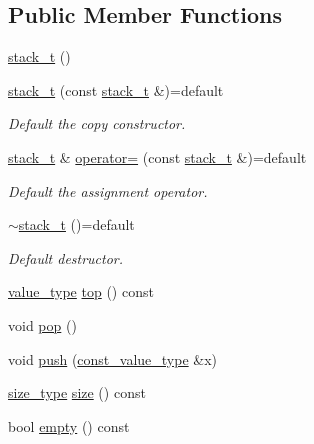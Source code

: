 \subsection*{Public Member Functions}
\begin{DoxyCompactItemize}
\item 
\hyperlink{classstk_1_1stack__t_ab7605ffb3efbfdaf23c1411dba8076d7}{stack\+\_\+t} ()
\item 
\mbox{\label{classstk_1_1stack__t_a27abcc49011f8cd22cd92395655f8ca4}} 
\hyperlink{classstk_1_1stack__t_a27abcc49011f8cd22cd92395655f8ca4}{stack\+\_\+t} (const \hyperlink{classstk_1_1stack__t}{stack\+\_\+t} \&)=default
\begin{DoxyCompactList}\small\item\em Default the copy constructor. \end{DoxyCompactList}\item 
\mbox{\label{classstk_1_1stack__t_a680884feaecd4cb19ea890893c583fdb}} 
\hyperlink{classstk_1_1stack__t}{stack\+\_\+t} \& \hyperlink{classstk_1_1stack__t_a680884feaecd4cb19ea890893c583fdb}{operator=} (const \hyperlink{classstk_1_1stack__t}{stack\+\_\+t} \&)=default
\begin{DoxyCompactList}\small\item\em Default the assignment operator. \end{DoxyCompactList}\item 
\mbox{\label{classstk_1_1stack__t_acd6dfd6efc2edad5c9bd8f126c415a69}} 
\hyperlink{classstk_1_1stack__t_acd6dfd6efc2edad5c9bd8f126c415a69}{$\sim$stack\+\_\+t} ()=default
\begin{DoxyCompactList}\small\item\em Default destructor. \end{DoxyCompactList}\item 
\hyperlink{classstk_1_1stack__t_a05d1586fa8257268f0c1ade7ffc4588e}{value\+\_\+type} \hyperlink{classstk_1_1stack__t_a4c8dca98c8f18b9d60398ac75aba5af7}{top} () const
\item 
void \hyperlink{classstk_1_1stack__t_a5be99b150a46b8456643cbc40bcefca8}{pop} ()
\item 
void \hyperlink{classstk_1_1stack__t_aad7638faa441f17e91ba9a8f5663be4c}{push} (\hyperlink{classstk_1_1stack__t_a27d586bc06e0faf30a2a980cd8ffd125}{const\+\_\+value\+\_\+type} \&x)
\item 
\hyperlink{classstk_1_1stack__t_ade199c494a8e4455f76cc04faf138ed8}{size\+\_\+type} \hyperlink{classstk_1_1stack__t_a50dbd2e6626510af69ba1f38882ca1b5}{size} () const
\item 
bool \hyperlink{classstk_1_1stack__t_adb144d5de96aeeed6dee8d902158f1a6}{empty} () const
\end{DoxyCompactItemize}
